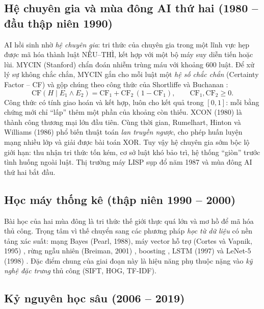\subsection{Hệ chuyên gia và mùa đông AI thứ hai (1980 – đầu thập niên 1990)}

AI hồi sinh nhờ \emph{hệ chuyên gia}: tri thức của chuyên gia trong một lĩnh vực hẹp được mã hóa thành luật NẾU–THÌ, kết hợp với một bộ máy suy diễn tiến hoặc lùi. MYCIN (Stanford) chẩn đoán nhiễm trùng máu với khoảng 600 luật. Để xử lý sự không chắc chắn, MYCIN gắn cho mỗi luật một \emph{hệ số chắc chắn} (Certainty Factor – CF) và gộp chúng theo công thức của Shortliffe và Buchanan \cite{shortliffe1975}:
\begin{equation}
\mathrm{CF}(H \mid E_1 \wedge E_2) = \mathrm{CF}_1 + \mathrm{CF}_2\,(1 - \mathrm{CF}_1), \qquad \mathrm{CF}_1, \mathrm{CF}_2 \ge 0.
\label{eq:mycin}
\end{equation}
Công thức  có tính giao hoán và kết hợp, luôn cho kết quả trong $[0,1]$: mỗi bằng chứng mới chỉ ``lấp'' thêm một phần của khoảng còn thiếu. XCON (1980) là thành công thương mại lớn đầu tiên. Cùng thời gian, Rumelhart, Hinton và Williams (1986) \cite{rumelhart1986} phổ biến thuật toán \emph{lan truyền ngược}, cho phép huấn luyện mạng nhiều lớp và giải được bài toán XOR. Tuy vậy hệ chuyên gia sớm bộc lộ giới hạn: thu nhận tri thức tốn kém, cơ sở luật khó bảo trì, hệ thống ``giòn'' trước tình huống ngoài luật. Thị trường máy LISP sụp đổ năm 1987 và mùa đông AI thứ hai bắt đầu.

\subsection{Học máy thống kê (thập niên 1990 – 2000)}

Bài học của hai mùa đông là tri thức thế giới thực quá lớn và mơ hồ để mã hóa thủ công. Trọng tâm vì thế chuyển sang các phương pháp \emph{học từ dữ liệu} có nền tảng xác suất: mạng Bayes (Pearl, 1988), máy vector hỗ trợ (Cortes và Vapnik, 1995) \cite{cortes1995}, rừng ngẫu nhiên (Breiman, 2001) \cite{breiman2001}, boosting \cite{friedman2001}, LSTM (1997) \cite{hochreiter1997} và LeNet-5 (1998) \cite{lecun1998}. Đặc điểm chung của giai đoạn này là hiệu năng phụ thuộc nặng vào \emph{kỹ nghệ đặc trưng} thủ công (SIFT, HOG, TF-IDF).

\subsection{Kỷ nguyên học sâu (2006 – 2019)}

